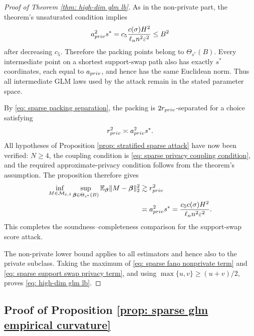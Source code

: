 \documentclass[letterpaper,12pt]{article}
\numberwithin{equation}{section}
\theoremstyle{plain}
\numberwithin{Theorem}{section}
\numberwithin{proposition}{section}
\numberwithin{Lemma}{section}
{
	\theoremstyle{definition}
	\newtheorem{Definition}{Definition}
	\newtheorem{example}{Example}
	\numberwithin{example}{section}
	\newtheorem{fact}{Fact}
	\numberwithin{fact}{section}
	\newtheorem{remark}{Remark}
}
\newcommand{\1}{\mathbbm{1}}
\def\bbeta{{\boldsymbol{\beta}}}
\def\E{\mathbb{E}}
\begin{document}
\begin{proof}[Proof of Theorem \ref{thm: high-dim glm lb}]
As in the non-private part, the theorem's unsaturated condition implies
\begin{align*}
    a_{\rm priv}^2s^*
    =c_5\frac{c(\sigma)H^2}{\ell_n n^2\varepsilon^2}
    \leq B^2
\end{align*}
after decreasing $c_5$.  Therefore the packing points belong to
$\Theta_{s^*}(B)$.  Every intermediate point on a shortest support-swap
path also has exactly $s^*$ coordinates, each equal to
$a_{\rm priv}$, and hence has the same Euclidean norm.  Thus all
intermediate GLM laws used by the attack remain in the stated parameter
space.

By \eqref{eq: sparse packing separation}, the packing is $2r_{\rm
priv}$-separated for a choice satisfying
\begin{align*}
    r_{\rm priv}^2\asymp a_{\rm priv}^2s^*.
\end{align*}
All hypotheses of Proposition \ref{prop: stratified sparse attack} have
now been verified: $N\geq4$, the coupling condition is
\eqref{eq: sparse privacy coupling condition}, and the required
approximate-privacy condition follows from the theorem's assumption.
The proposition therefore gives
\begin{align}
    \inf_{M\in\mathcal M_{\varepsilon,\delta}}
    \sup_{\bbeta\in\Theta_{s^*}(B)}
    \E_\bbeta\|M-\bbeta\|_2^2
    &\gtrsim r_{\rm priv}^2\notag\\
    &\asymp a_{\rm priv}^2s^*
     =\frac{c_5c(\sigma)H^2}
     {\ell_n n^2\varepsilon^2}.                            \label{eq: sparse support swap privacy term}
\end{align}
	This completes the soundness--completeness comparison for the
	support-swap score attack.

The non-private lower bound applies to all estimators and hence also to
the private subclass.  Taking the maximum of
\eqref{eq: sparse fano nonprivate term} and
\eqref{eq: sparse support swap privacy term}, and using
$\max\{u,v\}\geq(u+v)/2$, proves \eqref{eq: high-dim glm lb}.
\end{proof}

\subsection{Proof of Proposition \ref{prop: sparse glm empirical curvature}}\label{sec: proof of prop: sparse glm empirical curvature}
\end{document}
